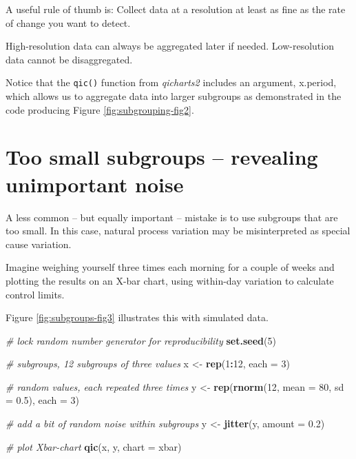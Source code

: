 \documentclass[
]{book}
\newenvironment{Shaded}{\begin{snugshade}}{\end{snugshade}}
\newcommand{\AttributeTok}[1]{\textcolor[rgb]{0.13,0.29,0.53}{#1}}
\newcommand{\CommentTok}[1]{\textcolor[rgb]{0.56,0.35,0.01}{\textit{#1}}}
\newcommand{\DecValTok}[1]{\textcolor[rgb]{0.00,0.00,0.81}{#1}}
\newcommand{\FloatTok}[1]{\textcolor[rgb]{0.00,0.00,0.81}{#1}}
\newcommand{\FunctionTok}[1]{\textcolor[rgb]{0.13,0.29,0.53}{\textbf{#1}}}
\newcommand{\NormalTok}[1]{#1}
\newcommand{\OtherTok}[1]{\textcolor[rgb]{0.56,0.35,0.01}{#1}}
\newcommand{\SpecialCharTok}[1]{\textcolor[rgb]{0.81,0.36,0.00}{\textbf{#1}}}
\newcommand{\StringTok}[1]{\textcolor[rgb]{0.31,0.60,0.02}{#1}}
\begin{document}
A useful rule of thumb is: Collect data at a resolution at least as fine as the rate of change you want to detect.

High-resolution data can always be aggregated later if needed. Low-resolution data cannot be disaggregated.

Notice that the \texttt{qic()} function from \emph{qicharts2} includes an argument, x.period, which allows us to aggregate data into larger subgroups as demonstrated in the code producing Figure \ref{fig:subgrouping-fig2}.

\section{Too small subgroups -- revealing unimportant noise}\label{too-small-subgroups-revealing-unimportant-noise}

A less common -- but equally important -- mistake is to use subgroups that are too small. In this case, natural process variation may be misinterpreted as special cause variation.

Imagine weighing yourself three times each morning for a couple of weeks and plotting the results on an X-bar chart, using within-day variation to calculate control limits.

Figure \ref{fig:subgroups-fig3} illustrates this with simulated data.

\begin{Shaded}
\begin{Highlighting}[]
\CommentTok{\# lock random number generator for reproducibility}
\FunctionTok{set.seed}\NormalTok{(}\DecValTok{5}\NormalTok{)}

\CommentTok{\# subgroups, 12 subgroups of three values}
\NormalTok{x }\OtherTok{\textless{}{-}} \FunctionTok{rep}\NormalTok{(}\DecValTok{1}\SpecialCharTok{:}\DecValTok{12}\NormalTok{, }\AttributeTok{each =} \DecValTok{3}\NormalTok{)}

\CommentTok{\# random values, each repeated three times}
\NormalTok{y }\OtherTok{\textless{}{-}} \FunctionTok{rep}\NormalTok{(}\FunctionTok{rnorm}\NormalTok{(}\DecValTok{12}\NormalTok{, }\AttributeTok{mean =} \DecValTok{80}\NormalTok{, }\AttributeTok{sd =} \FloatTok{0.5}\NormalTok{), }\AttributeTok{each =} \DecValTok{3}\NormalTok{)}

\CommentTok{\# add a bit of random noise within subgroups}
\NormalTok{y }\OtherTok{\textless{}{-}} \FunctionTok{jitter}\NormalTok{(y, }\AttributeTok{amount =} \FloatTok{0.2}\NormalTok{)}

\CommentTok{\# plot Xbar{-}chart}
\FunctionTok{qic}\NormalTok{(x, y, }\AttributeTok{chart =} \StringTok{\textquotesingle{}xbar\textquotesingle{}}\NormalTok{)}
\end{Highlighting}
\end{Shaded}
\end{document}
